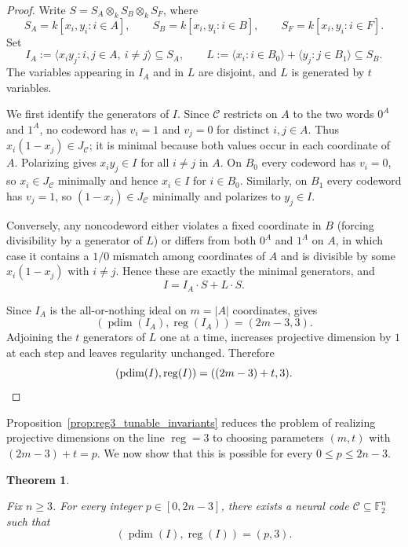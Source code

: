 \documentclass[12pt]{amsart}
\newtheorem{theorem}{Theorem}[section]
\theoremstyle{remark}
\theoremstyle{definition}
\DeclareMathOperator{\reg}{reg}
\DeclareMathOperator{\pd}{pdim}
\newcommand{\F}{\mathbb{F}}
\newcommand{\C}{\mathcal{C}}
\begin{document}
\begin{proof}
Write $S=S_A\otimes_k S_B\otimes_k S_F$, where
\[
S_A=k[x_i,y_i:i\in A],\qquad
S_B=k[x_i,y_i:i\in B],\qquad
S_F=k[x_i,y_i:i\in F].
\]
Set
\[
I_A:=\big\langle x_i y_j : i,j\in A,\ i\neq j\big\rangle \subseteq S_A,
\qquad
L:=\langle x_i : i\in B_0\rangle+\langle y_j : j\in B_1\rangle \subseteq S_B.
\]
The variables appearing in $I_A$ and in $L$ are disjoint, and $L$ is generated by $t$ variables.

We first identify the generators of $I$. Since $\C$ restricts on $A$ to the two words $0^A$ and $1^A$,
no codeword has $v_i=1$ and $v_j=0$ for distinct $i,j\in A$. Thus $x_i(1-x_j)\in J_\C$; it is minimal
because both values occur in each coordinate of $A$. Polarizing gives $x_i y_j\in I$ for all $i\neq j$ in $A$.
On $B_0$ every codeword has $v_i=0$, so $x_i\in J_\C$ minimally and hence $x_i\in I$ for $i\in B_0$.
Similarly, on $B_1$ every codeword has $v_j=1$, so $(1-x_j)\in J_\C$ minimally and polarizes to $y_j\in I$.

Conversely, any noncodeword either violates a fixed coordinate in $B$ (forcing divisibility by a generator of $L$)
or differs from both $0^A$ and $1^A$ on $A$, in which case it contains a $1/0$ mismatch among coordinates of $A$
and is divisible by some $x_i(1-x_j)$ with $i\neq j$. Hence these are exactly the minimal generators, and
\[
I = I_A\cdot S + L\cdot S.
\]

Since $I_A$ is the all-or-nothing ideal on $m=|A|$ coordinates,  gives
\[
(\pd(I_A), \reg(I_A))=(2m-3,3).
\]
Adjoining the $t$ generators of $L$ one at a time,  increases projective dimension
by $1$ at each step and leaves regularity unchanged. Therefore
\[
(\pd(I), \reg(I))=((2m-3)+t,3).\qedhere
\]
\end{proof}


Proposition~\ref{prop:reg3_tunable_invariants} reduces the problem of realizing projective dimensions on the line
$\reg=3$ to choosing parameters $(m,t)$ with $(2m-3)+t=p$. We now show that this is possible for every
$0\le p\le 2n-3$.

\begin{theorem}\label{thm:reg3_all_pdim}

Fix $n\ge 3$. For every integer $p\in[0,2n-3]$, there exists a neural code $\C\subseteq\F_2^n$
such that 
\[
(\pd(I), \reg(I))=(p,3).
\]
\end{theorem}
\end{document}
